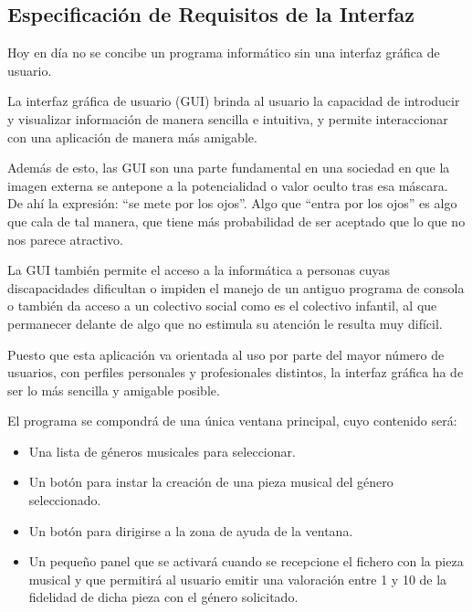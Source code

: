
\subsection{Especificación de Requisitos de la Interfaz}
\label{especificacion-interfaz}
Hoy en día no se concibe un programa informático sin una interfaz gráfica de usuario.

La interfaz gráfica de usuario (GUI) brinda al usuario la capacidad de introducir y visualizar información de manera sencilla e intuitiva, y permite interaccionar con una aplicación de manera más amigable.

Además de esto, las GUI son una parte fundamental en una sociedad en que la imagen externa se antepone a la potencialidad o valor oculto tras esa máscara. De ahí la expresión: ``se mete por los ojos''. Algo que ``entra por los ojos'' es algo que cala de tal manera, que tiene más probabilidad de ser aceptado que lo que no nos parece atractivo.

La GUI también permite el acceso a la informática a personas cuyas discapacidades dificultan o impiden el manejo de un antiguo programa de consola o también da acceso a un colectivo social como es el colectivo infantil, al que permanecer delante de algo que no estimula su atención le resulta muy difícil.

Puesto que esta aplicación va orientada al uso por parte del mayor número de usuarios, con perfiles personales y profesionales distintos, la interfaz gráfica ha de ser lo más sencilla y amigable posible.

El programa se compondrá de una única ventana principal, cuyo contenido será:

\begin{itemize}
    \item Una lista de géneros musicales para seleccionar.
    \item Un botón para instar la creación de una pieza musical del género seleccionado.
    \item Un botón para dirigirse a la zona de ayuda de la ventana.
    \item Un pequeño panel que se activará cuando se recepcione el fichero con la pieza musical y que permitirá al usuario emitir una valoración entre 1 y 10 de la fidelidad de dicha pieza con el género solicitado.
\end{itemize}